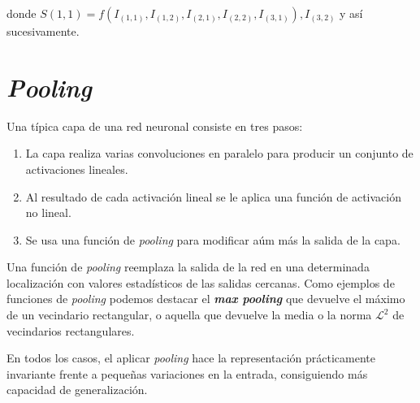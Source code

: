 	donde $S(1,1) = f(I_{(1,1)}, I_{(1,2)}, I_{(2,1)}, I_{(2,2)}, I_{(3,1)}), I_{(3,2)}$ y así sucesivamente.
	
	\section{\textit{Pooling}}
	
	Una típica capa de una red neuronal consiste en tres pasos:
	
	\begin{enumerate}
		\item La capa realiza varias convoluciones en paralelo para producir un conjunto de activaciones lineales.
		\item Al resultado de cada activación lineal se le aplica una función de activación no lineal. 
		\item Se usa una función de \textit{pooling} para modificar aúm más la salida de la capa.
	\end{enumerate}

	Una función de \textit{pooling} reemplaza la salida de la red en una determinada localización con valores estadísticos de las salidas cercanas. Como ejemplos de funciones de \textit{pooling} podemos destacar el \textbf{\textit{max pooling}} que devuelve el máximo de un vecindario rectangular, o aquella que devuelve la media o la norma $\mathcal{L}^2$ de vecindarios rectangulares.
	
	En todos los casos, el aplicar \textit{pooling} hace la representación prácticamente invariante frente a pequeñas variaciones en la entrada, consiguiendo más capacidad de generalización. 
	
	
